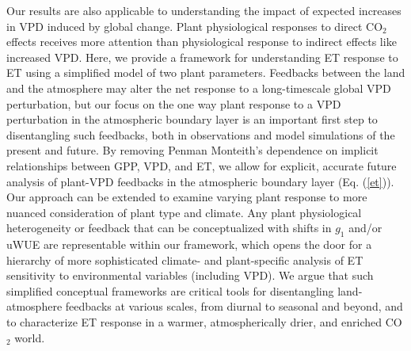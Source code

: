 Our results are also applicable to understanding the impact of
expected increases in VPD induced by global change.  Plant
physiological responses to direct CO$_2$ effects
\citep[e.g.,][]{Swann_2016, Lemordant_2018} receives more attention
than physiological response to indirect effects like increased
VPD. Here, we provide a framework for understanding ET response to ET
using a simplified model of two plant parameters. Feedbacks between the
land and the atmosphere may alter the net response to a long-timescale
global VPD perturbation, but our focus on the one way plant response
to a VPD perturbation in the atmospheric boundary layer is an
important first step to disentangling such feedbacks, both in
observations and model simulations of the present and future. By
removing Penman Monteith's dependence on implicit relationships
between GPP, VPD, and ET, we allow for explicit, accurate future
analysis of plant-VPD feedbacks in the atmospheric boundary layer
(Eq. (\ref{et})). Our approach can be extended to examine varying
plant response to more nuanced consideration of plant type and
climate. Any plant physiological heterogeneity or feedback that can be
conceptualized with shifts in $g_1$ \citep[e.g.][]{Lin_2015,
Medlyn_2017} and/or uWUE \citep[e.g.][]{Zhou_2014} are representable
within our framework, which opens the door for a hierarchy of more
sophisticated climate- and plant-specific analysis of ET sensitivity
to environmental variables (including VPD). We argue that such
simplified conceptual frameworks are critical tools for disentangling
land-atmosphere feedbacks at various scales, from diurnal to seasonal
and beyond, and to characterize ET response in a warmer,
atmospherically drier, and enriched CO$_2$ world.

